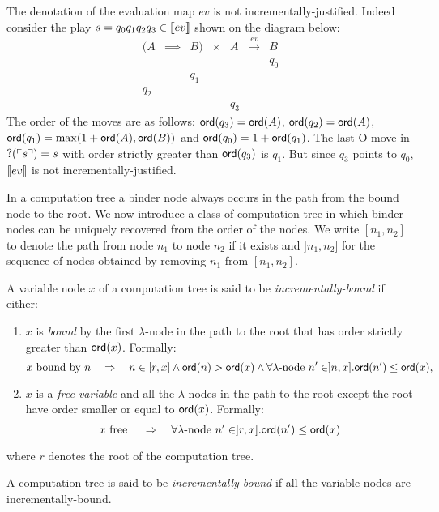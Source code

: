 \begin{exmp}
The denotation of the evaluation map $ev$ is not
incrementally-justified. Indeed consider the play $s = q_0 q_1 q_2
q_3 \in {[\![ev ]\!]}$ shown on the diagram below:
$$\begin{array}{cccccccc}
(A & \implies & B) & \times  & A & \stackrel{ev}{\longrightarrow} & B \\
&&&&&& q_0 \\
&& q_1 \\
 q_2 \\
 &&&&q_3
\end{array}$$
The order of the moves are as follows:  ${\sf ord}(q_3) = {\sf ord}(A)$,
${\sf ord}(q_2) = {\sf ord}(A)$, ${\sf ord}(q_1) = \max( 1+{\sf ord}(A), {\sf ord}(B))$ and
${\sf ord}(q_0) = 1 + {\sf ord}(q_1)$. The last O-move in $?(\ulcorner s \urcorner)= s$
with order strictly greater than ${\sf ord}(q_3)$ is $q_1$.
 But since $q_3$ points to $q_0$, ${[\![ ev ]\!]}$ is not incrementally-justified.
\end{exmp}


In a computation tree a binder node always occurs in the path from
the bound node to the root. We now introduce a class of computation
tree in which binder nodes can be uniquely recovered from the order
of the nodes. We write $[n_1,n_2]$ to denote the path from node
$n_1$ to node $n_2$ if it exists and $]n_1,n_2]$ for the sequence of
nodes obtained by removing $n_1$ from $[n_1,n_2]$.

\begin{dfn}
A variable node $x$ of a computation tree is said to be
\emph{incrementally-bound} if either:
\begin{enumerate}
\item $x$ is \emph{bound} by the first $\lambda$-node in the path to the root that has
order strictly greater than ${\sf ord}(x)$. Formally:
$$ x \mbox{ bound by } n \quad \Rightarrow \quad n \in [r,x] \wedge {\sf ord}(n) > {\sf ord}(x) \wedge \forall \lambda\mbox{-node } n' \in ]n,x] . {\sf ord}(n') \leq {\sf ord}(x),$$

\item $x$ is a \emph{free variable} and all the $\lambda$-nodes in the path to the root except the root have order
smaller or equal to ${\sf ord}(x)$. Formally:
$$ x \mbox{ free } \quad \Rightarrow \quad  \forall \lambda\mbox{-node } n' \in ]r,x] . {\sf ord}(n') \leq {\sf ord}(x)$$
\end{enumerate}
where $r$ denotes the root of the computation tree.

A computation tree is said to be \emph{incrementally-bound} if all
the variable nodes are incrementally-bound.
\end{dfn}


